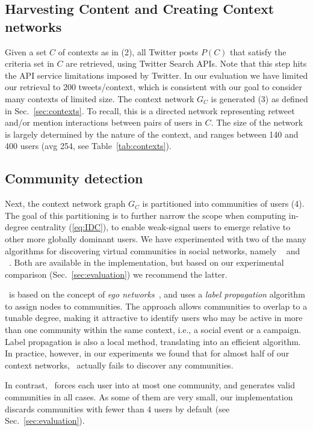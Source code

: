 \subsection{Harvesting Content and Creating Context networks} \label{sec:harvesting}
%
Given a set $C$ of contexts as in (2), all Twitter posts $P(C)$ that satisfy the criteria set in $C$ are retrieved, using Twitter Search APIs.
Note that this step hits the API service limitations imposed by Twitter. In our evaluation we have limited our retrieval to 200 tweets/context, which is consistent with our goal to consider many contexts of limited size.
%
The context network $G_C$ is generated (3) as defined in Sec.~\ref{sec:contexts}. To recall, this is a directed network representing retweet and/or mention interactions between pairs of users in $C$. 
The size of the network is largely determined by the nature of the context, and  ranges between 140 and 400 users (avg 254, see Table~\ref{tab:contexts}).

\subsection{Community detection} \label{sec:communities}

Next, the context network graph $G_C$  is partitioned into communities of users (4).
The goal of this partitioning is to further narrow the scope when computing in-degree centrality (\ref{eq:IDC}), 
to enable weak-signal users to emerge relative to other more globally dominant users.
%
We have experimented with two of the many algorithms for discovering virtual communities in social networks, namely \demon~\cite{Coscia:2012:DLD:2339530.2339630} and  \infomap~\cite{INFOMAP}. 
Both are available in the implementation, but based on our experimental comparison (Sec.~\ref{sec:evaluation}) we recommend the latter.

\demon~is based on the concept of \textit{ego networks}~\cite{Arnaboldi2013}, and uses a \textit{label propagation} algorithm to assign nodes to communities.  
The approach allows communities to overlap to a tunable degree, making it attractive to identify users who may be active in more than one community within the same context, i.e., a social event or a campaign.
Label propagation is also a local method, translating into an efficient algorithm.
In practice, however, in our experiments we found that for almost half of our context networks, \demon~actually fails to discover any communities.

In contrast, \infomap~forces each user into at most one community, and generates valid communities in all cases. 
As some of them are very small, our  implementation discards communities with fewer than 4 users by default (see Sec.~\ref{sec:evaluation}).
%

